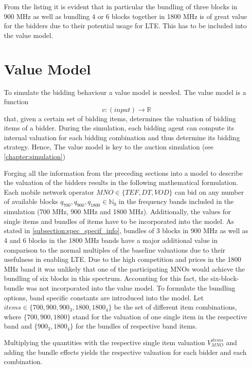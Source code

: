 From the listing it is evident that in particular the bundling of three blocks in 900 MHz as well as bundling 4 or 6 blocks together in 1800 MHz is of great value for the bidders due to their potential usage for LTE. This has to be included into the value model.

\section{Value Model}\label{subsection:value-model}
To simulate the bidding behaviour a value model is needed. The value model is a function $$ v: (input) \longrightarrow \mathbb{R} $$ that, given a certain set of bidding items, determines the valuation of bidding items of a bidder. During the simulation, each bidding agent can compute its internal valuation for each bidding combination and thus determine its bidding strategy. Hence, The value model is key to the auction simulation (see \autoref{chapter:simulation})

Forging all the information from the preceding sections into a model to describe the valuation of the bidders results in the following mathematical formulation. Each mobile network operator $MNO \in \{TEF, DT, VOD\}$ can bid on any number of available blocks $q_{700}, q_{900}, q_{1800} \in \mathbb{N}_{0}$ in the frequency bands included in the simulation (700 MHz, 900 MHz and 1800 MHz). Additionally, the values for single items and bundles of items have to be incorporated into the model. As stated in \autoref{subsection:spec_specif_info}, bundles of 3 blocks in 900 MHz as well as 4 and 6 blocks in the 1800 MHz bands have a major additional value in comparison to the normal multiples of the baseline valuations due to their usefulness in enabling LTE. Due to the high competition and prices in the 1800 MHz band it was unlikely that one of the participating MNOs would achieve the bundling of six blocks in this spectrum. Accounting for this fact, the six-block-bundle was not incorporated into the value model.
To formulate the bundling options, band specific constants are introduced into the model. Let $items \in \{700, 900, 900_{3}, 1800, 1800_{4}\}$ be the set of different item combinations, where $\{700, 900, 1800\}$ stand for the valuation of one single item in the respective band and $\{900_{3}, 1800_{4}\}$ for the bundles of respective band items.

Multiplying the quantities with the respective single item valuation $ V_{MNO}^{items} $ and adding the bundle effects yields the respective valuation for each bidder and each combination. 

